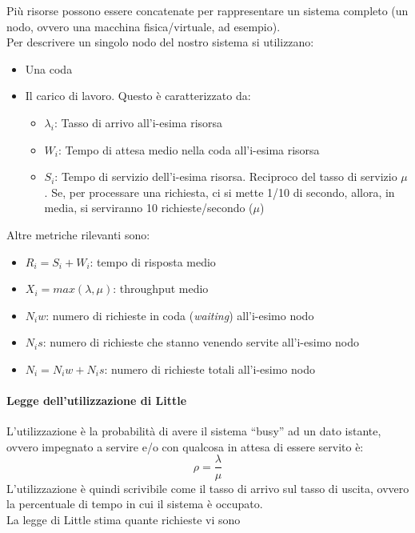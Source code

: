 \documentclass{article}
\begin{document}
		Più risorse possono essere concatenate per rappresentare un sistema completo (un nodo, ovvero
		una macchina fisica/virtuale, ad esempio).\\
		
		Per descrivere un singolo nodo del nostro sistema si utilizzano:
		\begin{itemize}
			\item Una coda
			\item Il carico di lavoro. Questo è caratterizzato da:
			\begin{itemize}
				\item $\lambda_i$: Tasso di arrivo all'i-esima risorsa
				\item $W_i$: Tempo di attesa medio nella coda all'i-esima risorsa
				\item $S_i$: Tempo di servizio dell'i-esima risorsa. Reciproco del tasso di servizio $\mu$. Se, per processare una richiesta, ci si mette 1/10 di
				secondo, allora, in media, si serviranno 10 richieste/secondo ($\mu$)
			\end{itemize}
		\end{itemize}
		
		Altre metriche rilevanti sono:
		\begin{itemize}
			\item $R_i = S_i + W_i$: tempo di risposta medio 
			\item $X_i = max(\lambda, \mu)$: throughput medio
			\item $N_iw$: numero di richieste in coda (\textit{waiting}) all'i-esimo nodo
			\item $N_is$: numero di richieste che stanno venendo servite all'i-esimo nodo
			\item $N_i = N_iw + N_is$: numero di richieste totali all'i-esimo nodo
		\end{itemize}
		
		\paragraph{Legge dell'utilizzazione di Little}\label{little-law}
		L’utilizzazione è la probabilità di avere il sistema “busy” ad un dato istante, ovvero impegnato a servire e/o con qualcosa in attesa di essere servito è:
		\[\rho = \frac{\lambda}{\mu} \]
		L'utilizzazione è quindi scrivibile come il tasso di arrivo sul tasso di uscita, ovvero la percentuale di tempo in cui il sistema è occupato.\\
		
		La legge di Little stima quante richieste vi sono 
		
\end{document}
